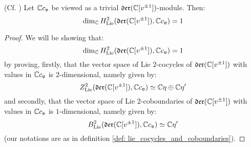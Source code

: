         \begin{lemma} \label{lemma: uniqueness_of_virasoro_cocycle}
            (Cf. \cite[Proposition 1.3]{kac_raina_rozhkovskaya_bombay_lectures_on_highest_weight_modules_of_infinite_dimensional_lie_algebras}) Let $\mathbb{C} c_{\mathfrak{v}}$ be viewed as a trivial $\mathfrak{der}(\mathbb{C}[v^{\pm 1}])$-module. Then:
                $$\dim_{\mathbb{C}} H^2_{\mathrm{Lie}}( \mathfrak{der}(\mathbb{C}[v^{\pm 1}]), \mathbb{C} c_{\mathfrak{v}} ) = 1$$
        \end{lemma}
            \begin{proof}
                We will be showing that:
                    $$\dim_{\mathbb{C}} H^2_{\mathrm{Lie}}( \mathfrak{der}(\mathbb{C}[v^{\pm 1}]), \mathbb{C} c_{\mathfrak{v}} ) = 1$$
                by proving, firstly, that the vector space of Lie $2$-cocycles of $\mathfrak{der}(\mathbb{C}[v^{\pm 1}])$ with values in $\mathbb{C} c_{\mathfrak{v}}$ is $2$-dimensional, namely given by:
                    $$Z^2_{\mathrm{Lie}}( \mathfrak{der}(\mathbb{C}[v^{\pm 1}]), \mathbb{C} c_{\mathfrak{v}} ) \simeq \mathbb{C} \eta \oplus \mathbb{C} \eta'$$
                and secondly, that the vector space of Lie $2$-coboundaries of $\mathfrak{der}(\mathbb{C}[v^{\pm 1}])$ with values in $\mathbb{C} c_{\mathfrak{v}}$ is $1$-dimensional, namely given by:
                    $$B^2_{\mathrm{Lie}}( \mathfrak{der}(\mathbb{C}[v^{\pm 1}]), \mathbb{C} c_{\mathfrak{v}} ) \simeq \mathbb{C} \eta'$$
                (our notations are as in definition \ref{def: lie_cocycles_and_coboundaries}). 


\end{proof}
